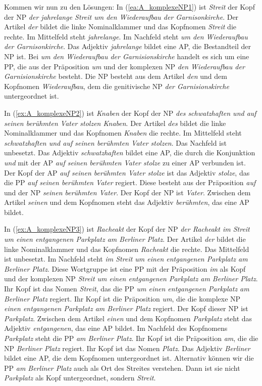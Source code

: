 Kommen wir nun zu den Lösungen: In (\ref{ea:A_komplexeNP1}) ist \textit{Streit} der Kopf der NP \textit{der jahrelange Streit um den Wiederaufbau der Garnisonkirche}. Der Artikel \textit{der} bildet die linke Nominalklammer und das Kopfnomen \textit{Streit} die rechte. Im Mittelfeld steht \textit{jahrelange}. Im Nachfeld steht \textit{um den Wiederaufbau der Garnisonkirche}. Das Adjektiv \textit{jahrelange} bildet eine AP, die Bestandteil der NP ist. Bei \textit{um den Wiederaufbau der Garnisionskirche} handelt es sich um eine PP, die aus der Präposition \textit{um} und der komplexen NP \textit{den Wiederaufbau der Garnisionskirche} besteht. Die NP besteht aus dem Artikel \textit{den} und dem Kopfnomen \textit{Wiederaufbau}, dem die genitivische NP \textit{der Garnisionskirche} untergeordnet ist.

In (\ref{ex:A_komplexeNP2}) ist \textit{Knaben} der Kopf der NP \textit{des schwatzhaften und auf seinen berühmten Vater stolzen Knaben}. Der Artikel \textit{des} bildet die linke Nominalklammer und das Kopfnomen \textit{Knaben} die rechte. Im Mittelfeld steht \textit{schwatzhaften und auf seinen berühmten Vater stolzen}. Das Nachfeld ist unbesetzt. Das Adjektiv \textit{schwatzhaften} bildet eine AP, die durch die Konjunktion \textit{und} mit der AP \textit{auf seinen berühmten Vater stolze} zu einer AP verbunden ist. Der Kopf der AP \textit{auf seinen berühmten Vater stolze} ist das Adjektiv \textit{stolze}, das die PP \textit{auf seinen berühmten Vater} regiert. Diese besteht aus der Präposition \textit{auf} und der NP \textit{seinen berühmten Vater}. Der Kopf der NP ist \textit{Vater}. Zwischen dem Artikel \textit{seinen} und dem Kopfnomen steht das Adjektiv \textit{berühmten}, das eine AP bildet.  

In (\ref{ex:A_komplexeNP3}) ist \textit{Racheakt} der Kopf der NP \textit{der Racheakt im Streit um einen entgangenen Parkplatz am Berliner Platz}. Der Artikel \textit{der} bildet die linke Nominalklammer und das Kopfnomen \textit{Racheakt} die rechte. Das Mittelfeld ist unbesetzt. Im Nachfeld steht \textit{im Streit um einen entgangenen Parkplatz am Berliner Platz}. Diese Wortgruppe ist eine PP mit der Präposition \textit{im} als Kopf und der komplexen NP \textit{Streit um einen entgangenen Parkplatz am Berliner Platz}. Ihr Kopf ist das Nomen \textit{Streit}, das die PP \textit{um einen entgangenen Parkplatz am Berliner Platz} regiert. Ihr Kopf ist die Präposition \textit{um}, die die komplexe NP \textit{einen entgangenen Parkplatz am Berliner Platz} regiert. Der Kopf dieser NP ist \textit{Parkplatz}. Zwischen dem Artikel \textit{einen} und dem Kopfnomen \textit{Parkplatz} steht das Adjektiv \textit{entgangenen}, das eine AP bildet. Im Nachfeld des Kopfnomens \textit{Parkplatz} steht die PP \textit{am Berliner Platz}. Ihr Kopf ist die Präposition \textit{am}, die die NP \textit{Berliner Platz} regiert. Ihr Kopf ist das Nomen \textit{Platz}. Das Adjektiv \textit{Berliner} bildet eine AP, die dem Kopfnomen untergeordnet ist. Alternativ können wir die PP \textit{am Berliner Platz} auch als Ort des Streites verstehen. Dann ist sie nicht \textit{Parkplatz} als Kopf untergeordnet, sondern \textit{Streit}.
